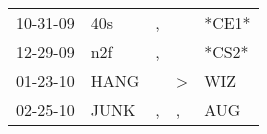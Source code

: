 \begin{supertabular}{p{0.07\textwidth}p{0.06\textwidth}p{0.02\textwidth}p{0.02\textwidth}p{0.06\textwidth}}
 10-31-09\textsuperscript{} &   40s\textsuperscript{} &  , &               &                  *CE1* \\
 12-29-09\textsuperscript{} &   n2f\textsuperscript{} &  , &               &                  *CS2* \\
 01-23-10\textsuperscript{} &  HANG\textsuperscript{} &    &  \textgreater &  WIZ\textsuperscript{} \\
 02-25-10\textsuperscript{} &  JUNK\textsuperscript{} &  , &             , &  AUG\textsuperscript{} \\
\end{supertabular}
